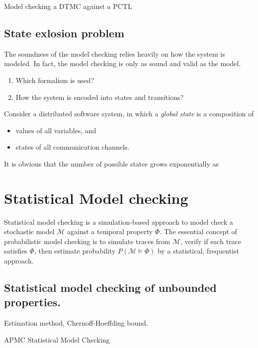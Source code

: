 \begin{algorithm}[H]
    \caption{Model checking a DTMC against a PCTL}
    \label{alg:dtmc-model-checking}
    \begin{algorithmic}[1]
        \EndProcedure
    \end{algorithmic}
\end{algorithm}

\begin{theorem}

\end{theorem}
\subsection{State exlosion problem}
The soundness of the model checking relies heavily on how the system is modeled. In fact, the model
checking is only as sound and valid as the model.
\begin{enumerate}
    \item Which formalism is used?
    \item How the system is encoded into states and transitions?
\end{enumerate}
Consider a distributed software system, in which a \textit{global state} is a composition of
\begin{itemize}
    \item values of all variables, and
    \item states of all communication channels.
\end{itemize}
It is obvious that the number of possible states grows exponentially as


\section{Statistical Model checking}
Statistical model checking is a simulation-based approach to model check a stochastic model
$\mathcal{M}$ against a temporal property $\Phi$. The essential concept of probabilistic model
checking is to simulate traces from $\mathcal{M}$, verify if each trace satisfies $\Phi$, then
estimate probability $P(\mathcal{M}\models\Phi)$ by a statistical, frequentist approach.
\subsection{Statistical model checking of unbounded properties.}
Estimation method, Chernoff-Hoeffding bound.
\begin{algorithm}[H]
    \caption{APMC Statistical Model Checking}
    \label{alg:smc-apmc}
    \begin{algorithmic}[1]
        \EndProcedure
    \end{algorithmic}
\end{algorithm}

